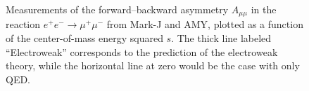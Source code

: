 \documentclass[a4paper,10pt]{article}
\begin{document}
\begin{figure}[htb]
\begin{center}

\caption{Measurements of the forward--backward asymmetry $A_{\mu\mu}$ in the reaction $e^+e^-\rightarrow\mu^+\mu^-$
from Mark-J and
AMY,
plotted as a function of the center-of-mass energy squared $s$. The thick line labeled ``Electroweak'' corresponds to the prediction of the electroweak theory, while
the horizontal line at zero would be the case with only QED. }
\end{center}
\end{figure}
%
\end{document}
